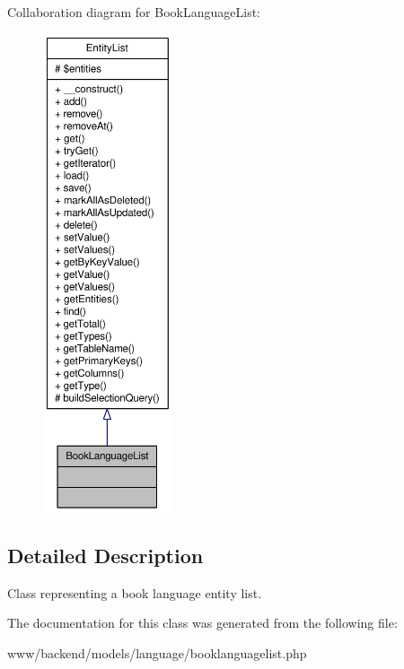 Collaboration diagram for BookLanguageList:\nopagebreak
\begin{figure}[H]
\begin{center}
\leavevmode
\includegraphics[height=400pt]{classBookLanguageList__coll__graph}
\end{center}
\end{figure}


\subsection{Detailed Description}
Class representing a book language entity list. 

The documentation for this class was generated from the following file:\begin{DoxyCompactItemize}
\item 
www/backend/models/language/booklanguagelist.php\end{DoxyCompactItemize}

